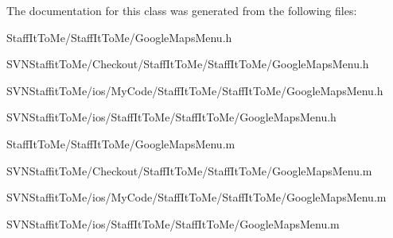 \-The documentation for this class was generated from the following files\-:\begin{DoxyCompactItemize}
\item 
\-Staff\-It\-To\-Me/\-Staff\-It\-To\-Me/\-Google\-Maps\-Menu.\-h\item 
\-S\-V\-N\-Staffit\-To\-Me/\-Checkout/\-Staff\-It\-To\-Me/\-Staff\-It\-To\-Me/\-Google\-Maps\-Menu.\-h\item 
\-S\-V\-N\-Staffit\-To\-Me/ios/\-My\-Code/\-Staff\-It\-To\-Me/\-Staff\-It\-To\-Me/\-Google\-Maps\-Menu.\-h\item 
\-S\-V\-N\-Staffit\-To\-Me/ios/\-Staff\-It\-To\-Me/\-Staff\-It\-To\-Me/\-Google\-Maps\-Menu.\-h\item 
\-Staff\-It\-To\-Me/\-Staff\-It\-To\-Me/\-Google\-Maps\-Menu.\-m\item 
\-S\-V\-N\-Staffit\-To\-Me/\-Checkout/\-Staff\-It\-To\-Me/\-Staff\-It\-To\-Me/\-Google\-Maps\-Menu.\-m\item 
\-S\-V\-N\-Staffit\-To\-Me/ios/\-My\-Code/\-Staff\-It\-To\-Me/\-Staff\-It\-To\-Me/\-Google\-Maps\-Menu.\-m\item 
\-S\-V\-N\-Staffit\-To\-Me/ios/\-Staff\-It\-To\-Me/\-Staff\-It\-To\-Me/\-Google\-Maps\-Menu.\-m\end{DoxyCompactItemize}
